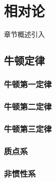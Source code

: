 \chapter{相对论}\label{28}

章节概述引入

\section{牛顿定律}\label{3-1}

\subsection{牛顿第一定律}\label{3-1-1}

\subsection{牛顿第二定律}\label{3-1-2}

\subsection{牛顿第三定律}\label{3-1-3}

\subsection{质点系}\label{3-1-4}

\subsection{非惯性系}\label{3-1-5}